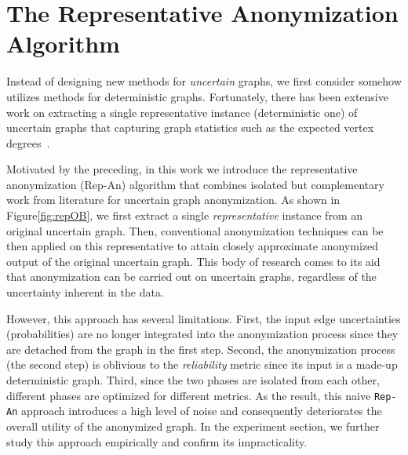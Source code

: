 \section{The Representative Anonymization Algorithm}
\label{sec:repOB}
Instead of designing new methods for \emph{uncertain} graphs, we first consider somehow utilizes methods for deterministic graphs. Fortunately, there has been extensive work on extracting a single representative instance (deterministic one) of uncertain graphs that capturing graph statistics such as the expected vertex degrees~\cite{Parchas_Gullo_Papadias_Bonchi_2014}.  

Motivated by the preceding, in this work we introduce the representative anonymization (Rep-An) algorithm that combines isolated but complementary work from literature for uncertain graph anonymization. As shown in Figure\ref{fig:repOB}, we first extract a single \emph{representative} instance from an original uncertain graph. Then, conventional anonymization techniques can be then applied on this representative to attain closely approximate anonymized output of the original uncertain graph. This body of research comes to its aid that anonymization can be carried out on uncertain graphs, regardless of the uncertainty inherent in the data.


However, this approach has several limitations. First, the input edge uncertainties (probabilities) are no longer integrated into the anonymization process since they are detached from the graph in the first step. Second, the anonymization process (the second step) is oblivious to the {\em reliability} metric since its input is a made-up deterministic graph. Third, since the two phases are isolated from each other, different phases are optimized for different metrics. As the result, this naive \texttt{Rep-An} approach introduces a high level of noise and consequently deteriorates the overall utility of the anonymized graph. 
In the experiment section, we further study this approach empirically and confirm its impracticality.


